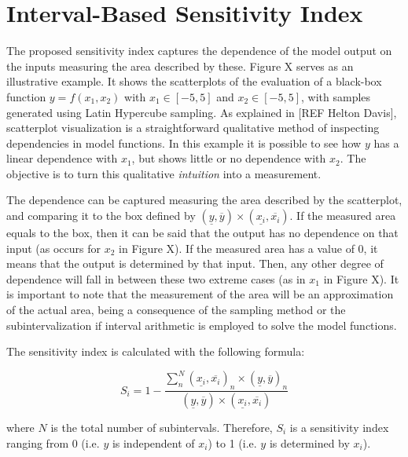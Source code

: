\documentclass[twocolumn]{rps-esrel2022}
\begin{document}
\section{Interval-Based Sensitivity Index}

The proposed sensitivity index captures the dependence of the model output on the inputs measuring the area described by these. %
Figure X serves as an illustrative example.
It shows the scatterplots of the evaluation of a black-box function $y = f(x_1,x_2)$ with $x_1 \in [-5,5]$ and $x_2 \in [-5,5]$, with samples generated using
Latin Hypercube sampling.
As explained in [REF Helton Davis], scatterplot visualization is a straightforward qualitative method of inspecting dependencies in model functions.
In this example it is possible to see how $y$ has a linear dependence with $x_1$, but shows little or no dependence with $x_2$.
The objective is to turn this qualitative \textit{intuition} into a measurement.


The dependence can be captured measuring the area described by the scatterplot, and comparing it to the box defined by $(\underline{y},\overline{y})\times(\underline{x_i},\overline{x_i})$.
If the measured area equals to the box, then it can be said that the output has no dependence on that input (as occurs for $x_2$ in Figure X).
If the measured area has a value of 0, it means that the output is determined by that input.
Then, any other degree of dependence will fall in between these two extreme cases (as in $x_1$ in Figure X).
It is important to note that the measurement of the area will be an approximation of the actual area, being a consequence of the sampling method or the subintervalization
if interval arithmetic is employed to solve the model functions.

The sensitivity index is calculated with the following formula:

\begin{equation}
	S_i = 1 - \frac{\sum_n^N(\underline{x_i},\overline{x_i})_n\times(\underline{y},\overline{y})_n}{(\underline{y},\overline{y})\times(\underline{x_i},\overline{x_i})}
\end{equation}

where $N$ is the total number of subintervals.
Therefore, $S_i$ is a sensitivity index ranging from 0 (i.e. $y$ is independent of $x_i$) to 1 (i.e. $y$ is determined by $x_i$).
\end{document}
